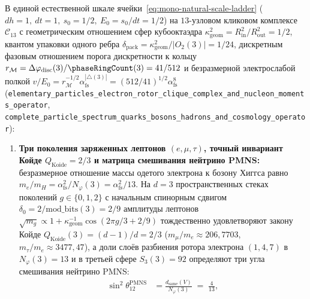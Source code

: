 \begin{theorem}
\label{thm:mono-complete-sm-particle-atlas}
В единой естественной шкале ячейки~\eqref{eq:mono-natural-scale-ladder} ($dh = 1,\ dt = 1,\ s_0 = 1/2,\ E_0 = s_0/dt = 1/2$) на $13$-узловом кликовом комплексе $\mathcal{C}_{13}$ с геометрическим отношением сфер кубооктаэдра $\kappa_{\mathrm{geom}}^2 = R_{\mathrm{in}}^2 / R_{\mathrm{out}}^2 = 1/2$, квантом упаковки одного ребра $\delta_{\mathrm{pack}} = \kappa_{\mathrm{geom}}^2 / |O_2(3)| = 1/24$, дискретным фазовым отношением порога дискретности к кольцу $r_{\mathcal{M}} = \Delta\varphi_{\mathrm{disc}}(3)/\phaseRingCount(3) = 41/512$ и безразмерной электрослабой полкой $v / E_0 = r_{\mathcal{M}}^{-1/2}\alpha_{\mathrm{fs}}^{|{\triangle}(3)|} = (512/41)^{1/2}\alpha_{\mathrm{fs}}^8$ (\texttt{elementary\_\allowbreak particles\_\allowbreak electron\_\allowbreak rotor\_\allowbreak clique\_\allowbreak complex\_\allowbreak and\_\allowbreak nucleon\_\allowbreak moments\_\allowbreak operator}, \texttt{complete\_\allowbreak particle\_\allowbreak spectrum\_\allowbreak quarks\_\allowbreak bosons\_\allowbreak hadrons\_\allowbreak and\_\allowbreak cosmology\_\allowbreak operator}):
\begin{enumerate}[label=\textbf{(\arabic*)},leftmargin=*]
\item \textbf{Три поколения заряженных лептонов $(e, \mu, \tau)$, точный инвариант Койде $Q_{\mathrm{Koide}} = 2/3$ и матрица смешивания нейтрино PMNS:}
  безразмерное отношение массы одетого электрона к бозону Хиггса равно $m_e / m_H = \alpha_{\mathrm{fs}}^2 / N_\varphi(3) = \alpha_{\mathrm{fs}}^2 / 13$. На $d = 3$ пространственных стеках поколений $g \in \{0, 1, 2\}$ с начальным спинорным сдвигом $\delta_0 = 2/\mathrm{mod\_bits}(3) = 2/9$ амплитуды лептонов $\sqrt{m_g} \propto 1 + \kappa_{\mathrm{geom}}^{-1}\cos(2\pi g/3 + 2/9)$ тождественно удовлетворяют закону Койде $Q_{\mathrm{Koide}}(3) = (d - 1)/d = 2/3$ ($m_\mu / m_e \approx 206{,}7703$, $m_\tau / m_e \approx 3477{,}47$), а доли слоёв разбиения ротора электрона $(1, 4, 7)$ в $N_\varphi(3) = 13$ и в третьей сфере $S_3(3) = 92$ определяют три угла смешивания нейтрино PMNS:
  \begin{align}
    \sin^2\theta_{12}^{\mathrm{PMNS}} &= \frac{d_{\mathrm{same}}(V)}{N_\varphi(3)} \;=\; \frac{4}{13}, \label{eq:mono-pmns-angles} \\

\end{align}
\end{enumerate}
\end{theorem}
